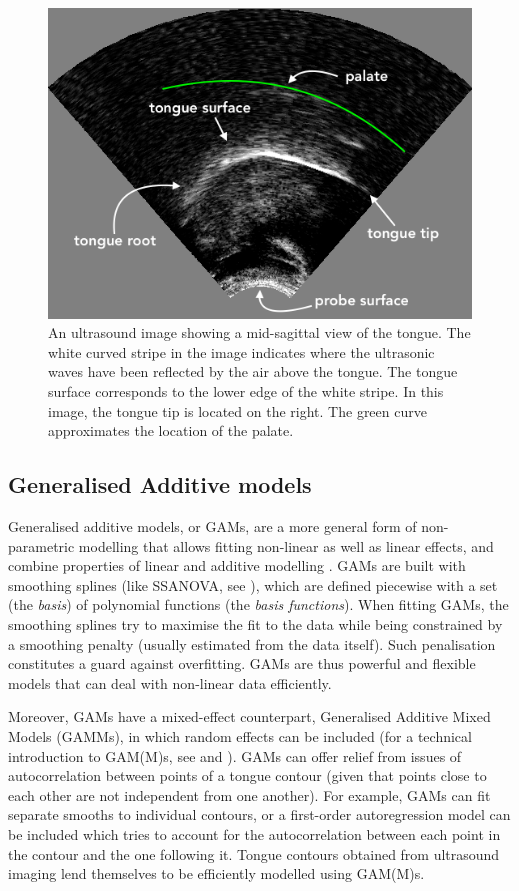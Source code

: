 \documentclass[11pt,]{article}
\begin{document}
\begin{figure}
  \centering
  \includegraphics{./img/uti.png}
  \caption{An ultrasound image showing a mid-sagittal view of the tongue. The white curved stripe in the image indicates where the ultrasonic waves have been reflected by the air above the tongue. The tongue surface corresponds to the lower edge of the white stripe. In this image, the tongue tip is located on the right. The green curve approximates the location of the palate.}
  \label{f:uti}
\end{figure}

\hypertarget{generalised-additive-models}{%
\subsection{Generalised Additive
models}\label{generalised-additive-models}}

Generalised additive models, or GAMs, are a more general form of
non-parametric modelling that allows fitting non-linear as well as
linear effects, and combine properties of linear and additive modelling
\citep{hastie1986}. GAMs are built with smoothing splines (like SSANOVA,
see \citealt{helwig2016}), which are defined piecewise with a set (the
\emph{basis}) of polynomial functions (the \emph{basis functions}). When
fitting GAMs, the smoothing splines try to maximise the fit to the data
while being constrained by a smoothing penalty (usually estimated from
the data itself). Such penalisation constitutes a guard against
overfitting. GAMs are thus powerful and flexible models that can deal
with non-linear data efficiently.

Moreover, GAMs have a mixed-effect counterpart, Generalised Additive
Mixed Models (GAMMs), in which random effects can be included (for a
technical introduction to GAM(M)s, see \citealt{zuur2012} and
\citealt{wood2017}). GAMs can offer relief from issues of
autocorrelation between points of a tongue contour (given that points
close to each other are not independent from one another). For example,
GAMs can fit separate smooths to individual contours, or a first-order
autoregression model can be included which tries to account for the
autocorrelation between each point in the contour and the one following
it. Tongue contours obtained from ultrasound imaging lend themselves to
be efficiently modelled using GAM(M)s.
\end{document}
